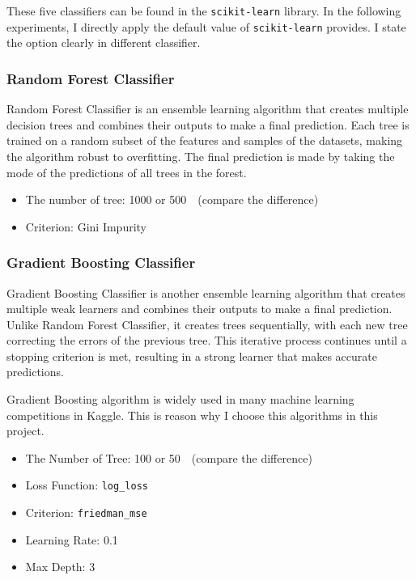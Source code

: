 \documentclass[twocolumn]{extarticle}
\begin{document}
These five classifiers can be found in the \texttt{scikit-learn} library. In the following experiments, I directly apply the default value of \texttt{scikit-learn} provides. I state the option clearly in different classifier.

\subsubsection{Random Forest Classifier}

Random Forest Classifier is an ensemble learning algorithm that creates multiple decision trees and combines their outputs to make a final prediction. Each tree is trained on a random subset of the features and samples of the datasets, making the algorithm robust to overfitting. The final prediction is made by taking the mode of the predictions of all trees in the forest.

\begin{itemize}
\item The number of tree: 1000 or 500　(compare the difference)
\item Criterion: Gini Impurity
\end{itemize}

\subsubsection{Gradient Boosting Classifier}

Gradient Boosting Classifier is another ensemble learning algorithm that creates multiple weak learners and combines their outputs to make a final prediction. Unlike Random Forest Classifier, it creates trees sequentially, with each new tree correcting the errors of the previous tree. This iterative process continues until a stopping criterion is met, resulting in a strong learner that makes accurate predictions.

Gradient Boosting algorithm is widely used in many machine learning competitions in Kaggle. This is reason why I choose this algorithms in this project.

\begin{itemize}
\item The Number of Tree: 100 or 50　(compare the difference)
\item Loss Function: \texttt{log\_loss}
\item Criterion: \texttt{friedman\_mse}
\item Learning Rate: 0.1
\item Max Depth: 3
\end{itemize}
\end{document}
